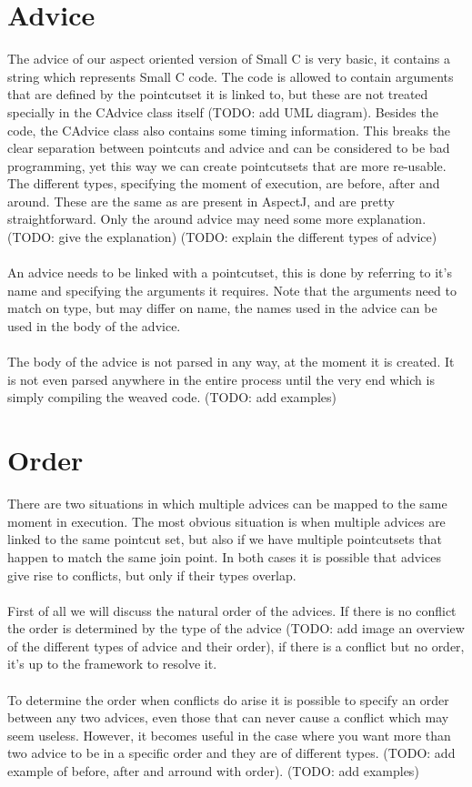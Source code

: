\documentclass[a4paper]{report}
\begin{document}
\section{Advice}
The advice of our aspect oriented version of Small C is very basic, it contains a string which represents Small C code. The code is allowed to contain arguments that are defined by the pointcutset it is linked to, but these are not treated specially in the CAdvice class itself (TODO: add UML diagram). Besides the code, the CAdvice class also contains some timing information. This breaks the clear separation between pointcuts and advice and can be considered to be bad programming, yet this way we can create pointcutsets that are more re-usable. The different types, specifying the moment of execution, are before, after and around. These are the same as are present in AspectJ, and are pretty straightforward. Only the around advice may need some more explanation. (TODO: give the explanation) (TODO: explain the different types of advice)\\
\\
An advice needs to be linked with a pointcutset, this is done by referring to it's name and specifying the arguments it requires. Note that the arguments need to match on type, but may differ on name, the names used in the advice can be used in the body of the advice.\\
\\
The body of the advice is not parsed in any way, at the moment it is created. It is not even parsed anywhere in the entire process until the very end which is simply compiling the weaved code. (TODO: add examples)

\section{Order}
There are two situations in which multiple advices can be mapped to the same moment in execution. The most obvious situation is when multiple advices are linked to the same pointcut set, but also if we have multiple pointcutsets that happen to match the same join point. In both cases it is possible that advices give rise to conflicts, but only if their types overlap.\\
\\
First of all we will discuss the natural order of the advices. If there is no conflict the order is determined by the type of the advice (TODO: add image an overview of the different types of advice and their order), if there is a conflict but no order, it's up to the framework to resolve it.\\
\\
To determine the order when conflicts do arise it is possible to specify an order between any two advices, even those that can never cause a conflict which may seem useless. However, it becomes useful in the case where you want more than two advice to be in a specific order and they are of different types. (TODO: add example of before, after and arround with order).
(TODO: add examples)
\end{document}
